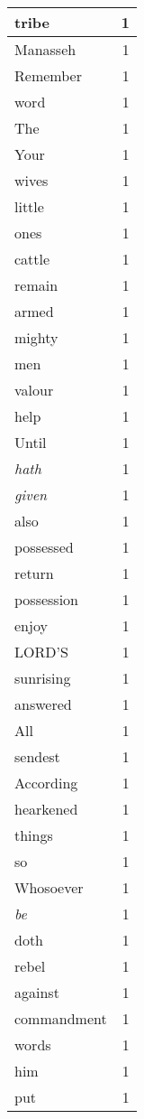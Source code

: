 \begin{center}
\begin{longtable}{l|r}
tribe & 1 \\ \hline
Manasseh & 1 \\ \hline
Remember & 1 \\ \hline
word & 1 \\ \hline
The & 1 \\ \hline
Your & 1 \\ \hline
wives & 1 \\ \hline
little & 1 \\ \hline
ones & 1 \\ \hline
cattle & 1 \\ \hline
remain & 1 \\ \hline
armed & 1 \\ \hline
mighty & 1 \\ \hline
men & 1 \\ \hline
valour & 1 \\ \hline
help & 1 \\ \hline
Until & 1 \\ \hline
\emph{hath} & 1 \\ \hline
\emph{given} & 1 \\ \hline
also & 1 \\ \hline
possessed & 1 \\ \hline
return & 1 \\ \hline
possession & 1 \\ \hline
enjoy & 1 \\ \hline
LORD'S & 1 \\ \hline
sunrising & 1 \\ \hline
answered & 1 \\ \hline
All & 1 \\ \hline
sendest & 1 \\ \hline
According & 1 \\ \hline
hearkened & 1 \\ \hline
things & 1 \\ \hline
so & 1 \\ \hline
Whosoever & 1 \\ \hline
\emph{be} & 1 \\ \hline
doth & 1 \\ \hline
rebel & 1 \\ \hline
against & 1 \\ \hline
commandment & 1 \\ \hline
words & 1 \\ \hline
him & 1 \\ \hline
put & 1 \\ \hline
\end{longtable}
\end{center}



